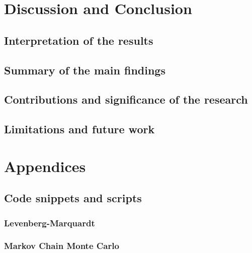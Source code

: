 \documentclass[12pt, TexShade, letterpaper]{report}
\begin{document}
\chapter{Discussion and Conclusion}
\label{chap:discussion}
\section{Interpretation of the results}
\section{Summary of the main findings}
\section{Contributions and significance of the research}
\section{Limitations and future work}
\chapter{Appendices}
\section{Code snippets and scripts}	
\subsection{Levenberg-Marquardt}
\label{chap:appendix,sub:LM}
\subsection{Markov Chain Monte Carlo}
\label{chap:appendix,sub:MCMC}
\end{document}
